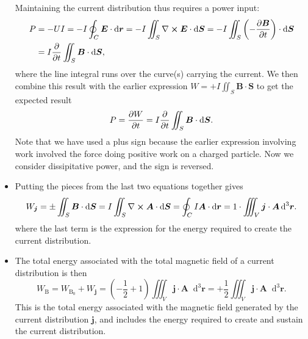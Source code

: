 \documentclass[11pt, a4paper]{article}
\newcommand{\diff}{\mathop{}\!\mathrm{d}} %
\newcommand{\dr}{\diff^{3} \r}  %
\renewcommand{\vec}[1]{\bm{#1}} %
\renewcommand{\r}{\vec{r}}
\newcommand{\E}{\vec{E}} %
\newcommand{\B}{\vec{B}} %
\newcommand{\A}{\vec{A}} %
\renewcommand{\j}{\vec{j}}  %
\renewcommand{\curl}{\nabla \cross}
\begin{document}
\begin{itemize}
    Maintaining the current distribution thus requires a power input:
    \begin{align*}
        P &= - UI = -I \oint_{C} \E \cdot \diff \r = - I \iint_{S} \curl \E \cdot \diff \vec{S} = - I \iint_{S} \left( - \pdv{\B}{t} \right) \cdot \diff \vec{S}\\
        &= I \pdv{t} \iint_{S} \B \cdot \diff \vec{S},
    \end{align*}
    where the line integral runs over the curve(s) carrying the current. We then combine this result with the earlier expression $ W = + I \iint_{S} \B \cdot \vec{S} $ to get the expected result
    \begin{equation*}
        P = \pdv{W}{t} = I \pdv{t} \iint_{S} \B \cdot \diff \vec{S}.
    \end{equation*}
    Note that we have used a plus sign because the earlier expression involving work involved the force doing positive work on a charged particle. Now we consider dissipitative power, and the sign is reversed.

    \item Putting the pieces from the last two equations together gives
    \begin{equation*}
        W_{\j} = \pm \iint_{S} \B \cdot \diff \vec{S} = I \iint_{S} \curl \A \cdot \diff \vec{S} = \oint_{C} I \A \cdot \diff \r = 1 \cdot \iiint_{V} \j \cdot \A \dr.
    \end{equation*}
    where the last term is the expression for the energy required to create the current distribution.
    
    \item The total energy associated with the total magnetic field of a current distribution is then
    \begin{equation*}
        W_{\text{B}} = W_{\text{B}_{0}} + W_{\vec{j}} = \left( -\frac{1}{2} + 1 \right) \iiint_{V} \j \cdot \A \dr = + \frac{1}{2} \iiint_{V} \j \cdot \A \dr.
    \end{equation*}
    This is the total energy associated with the magnetic field generated by the current distribution $ \j $, and includes the energy required to create and sustain the current distribution.
    
\end{itemize}
\end{document}
